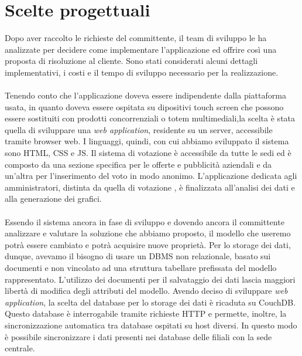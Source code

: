 \newpage
\section{Scelte progettuali}
Dopo aver raccolto le richieste del committente, il team di sviluppo le ha
analizzate per decidere come implementare l'applicazione ed offrire così una
proposta di risoluzione al cliente. Sono stati considerati alcuni dettagli
implementativi, i costi e il tempo di sviluppo necessario per la realizzazione.
\\\\
Tenendo conto che l'applicazione doveva essere indipendente dalla piattaforma
usata, in quanto doveva essere ospitata su dipositivi touch screen che possono
essere sostituiti con prodotti concorrenziali o totem multimediali,la scelta è
stata quella di sviluppare una \emph{web application}, residente su un server,
accessibile tramite browser web. I linguaggi, quindi, con cui abbiamo
sviluppato il sistema sono \ac{HTML}, \ac{CSS} e
\ac{JS}. Il sistema di votazione è accessibile da tutte le sedi ed è
composto da una sezione specifica per le offerte e pubblicità aziendali e da
un'altra per l'inserimento del voto in modo anonimo. L'applicazione dedicata
agli amministratori, distinta da quella di votazione , è finalizzata
all'analisi dei dati e alla generazione dei grafici.
\\\\
Essendo il sistema ancora in fase di sviluppo e dovendo ancora il committente
analizzare e valutare la soluzione che abbiamo proposto, il modello che useremo
potrà essere cambiato e potrà acquisire nuove proprietà. Per lo storage dei
dati, dunque, avevamo il bisogno di usare un \ac{DBMS} non relazionale, basato
sui documenti e non vincolato ad una struttura tabellare prefissata del modello
rappresentato. L'utilizzo dei documenti per il salvataggio dei dati lascia maggiori
libertà di modifica degli attributi del modello. Avendo deciso di sviluppare
\emph{web application}, la scelta del database per lo storage dei dati è
ricaduta su CouchDB. Questo database è interrogabile tramite richieste
\ac{HTTP} e permette, inoltre, la sincronizzazione automatica tra database
ospitati su host diversi. In questo modo è possibile sincronizzare i dati presenti nei database
delle filiali con la sede centrale.


